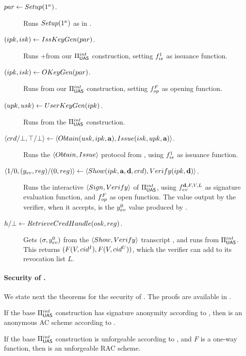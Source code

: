 \begin{description}
\item[$par \gets Setup(1^\kappa)$.] Runs $Setup(1^\kappa)$ as in
  \CUASGen.
\item[$(ipk,isk) \gets IssKeyGen(par)$.] Runs \KeyGen+\ISet from our
  $\Pi_{\mathsf{UAS}}^{int}$ construction, setting $f_{is}^1$ as issuance function.
\item[$(ipk,isk) \gets OKeyGen(par)$.] Runs \OKeyGen from our
  $\Pi_{\mathsf{UAS}}^{int}$ construction, setting $f_{op}^F$ as opening function.
\item[$(upk,usk) \gets UserKeyGen(ipk)$.] Runs \KeyGen from the
  $\Pi_{\mathsf{UAS}}^{int}$ construction.
\item[$\langle crd/\bot,\top/\bot \rangle \gets
  \langle Obtain(usk,ipk,\mathbf{a}),Issue(isk,upk,\mathbf{a}) \rangle$.]
  Runs the $\langle Obtain,Issue \rangle$ protocol from \CUASGen, using
  $f_{is}^1$ as issuance function.
\item[$\langle 1/0,(y_{ev},reg)/(0,reg)\rangle \gets \langle Show(ipk,
  \mathbf{a},\mathbf{d},crd),
  Verify(ipk,\mathbf{d}) \rangle$.]
  Runs the interactive $\langle Sign,Verify\rangle$ of $\Pi_{\mathsf{UAS}}^{int}$,
  using $f_{ev}^{\mathbf{d},F,V,L}$ as signature evaluation function, and
  $f_{op}^F$ as open function. The \yeval value output by the verifier, when
  it accepts, is the $y_{ev}^0$ value produced by \Sign.
\item[$h/\bot \gets RetrieveCredHandle(osk,reg)$.]
  Gets $(\sigma,y_{ev}^0)$ from the $\langle Show,Verify\rangle$ transcript
  \utrans, and runs \Open from $\Pi_{\mathsf{UAS}}^{int}$. This returns $(F(V,cid^I),
  F(V,cid^U))$, which the verifier can add to its revocation list $L$.
\end{description}

\paragraph{Security of \CUASRAC.} %
We state next the theorems for the security of \CUASRAC. The proofs are
available in .

\begin{theorem}
  If the base $\Pi_{\mathsf{UAS}}^{int}$ construction has signature anonymity according to
  , then \CUASRAC is an anonymous AC scheme
  according to \cite{fhs19}.  
\end{theorem}

\begin{theorem}
  If the base $\Pi_{\mathsf{UAS}}^{int}$ construction is unforgeable according to
  , and $F$ is a one-way function, then \CUASRAC is an
  unforgeable RAC scheme.
\end{theorem}

